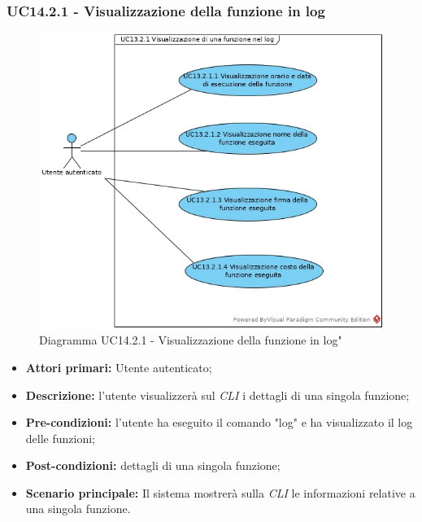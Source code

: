 \subsubsection{UC14.2.1 - Visualizzazione della funzione in log}
\begin{figure}[h]
	\centering
	\includegraphics[width=0.7\linewidth]{res/img/UC13.2.1.jpg}
	\caption{Diagramma UC14.2.1 - Visualizzazione della funzione in log"}
\end{figure}
\begin{itemize}
	\item \textbf{Attori primari:} Utente autenticato;
	\item \textbf{Descrizione:} l'utente visualizzerà sul \textit{CLI\glo} i dettagli di una singola funzione;
	\item \textbf{Pre-condizioni:} l'utente ha eseguito il comando "log" e ha visualizzato il log delle funzioni;
	\item \textbf{Post-condizioni:} dettagli di una singola funzione;
	\item \textbf{Scenario principale:} Il sistema mostrerà sulla \textit{CLI\glo} le informazioni relative a una singola funzione.
\end{itemize}

